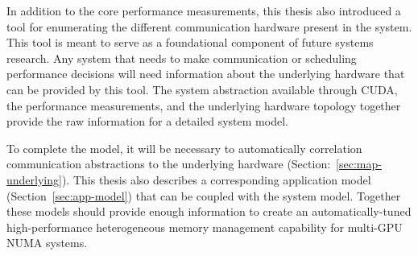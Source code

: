 In addition to the core performance measurements, this thesis also introduced a tool for enumerating the different communication hardware present in the system.
This tool is meant to serve as a foundational component of future systems research.
Any system that needs to make communication or scheduling performance decisions will need information about the underlying hardware that can be provided by this tool.
The system abstraction available through CUDA, the performance measurements, and the underlying hardware topology together provide the raw information for a detailed system model.

To complete the model, it will be necessary to automatically correlation communication abstractions to the underlying hardware (Section:~\ref{sec:map-underlying}).
This thesis also describes a corresponding application model (Section~\ref{sec:app-model}) that can be coupled with the system model.
Together these models should provide enough information to create an automatically-tuned high-performance heterogeneous memory management capability for multi-GPU NUMA systems.
